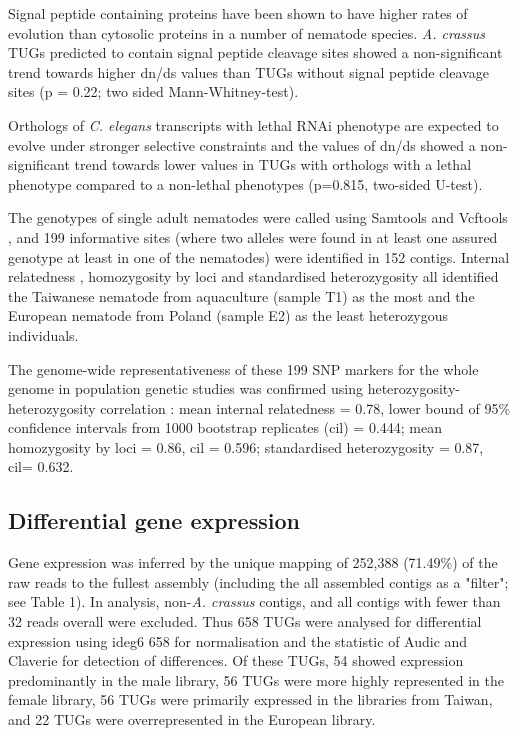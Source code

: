 \documentclass[10pt]{bmc_article}
\newenvironment{bmcformat}{\begin{raggedright}\baselineskip20pt\sloppy\setboolean{publ}{false}}{\end{raggedright}\baselineskip20pt\sloppy}
\begin{document}
\begin{bmcformat}
Signal peptide containing proteins have been shown to have higher
rates of evolution than cytosolic proteins in a number of nematode
species. \textit{A. crassus} TUGs predicted to contain signal peptide
cleavage sites showed a non-significant trend towards higher dn/ds
values than TUGs without signal peptide cleavage sites (p =
0.22; two sided Mann-Whitney-test).

Orthologs of \textit{C. elegans} transcripts with lethal RNAi
phenotype are expected to evolve under stronger selective constraints
and the values of dn/ds showed a non-significant trend towards lower
values in TUGs with orthologs with a lethal phenotype compared to a
non-lethal phenotypes (p=0.815, two-sided
U-test).

The genotypes of single adult nematodes were called using Samtools
\cite{journals/bioinformatics/LiHWFRHMAD09} and Vcftools
\cite{pmid21653522}, and 199 informative sites (where
two alleles were found in at least one assured genotype at least in
one of the nematodes) were identified in 152
contigs. Internal relatedness \cite{pmid11571049}, homozygosity by
loci \cite{pmid17107491} and standardised heterozygosity
\cite{coltman81j} all identified the Taiwanese nematode from
aquaculture (sample T1) as the most and the European nematode from
Poland (sample E2) as the least heterozygous individuals.

The genome-wide representativeness of these 199 SNP
markers for the whole genome in population genetic studies was
confirmed using heterozygosity-heterozygosity correlation
\cite{pmid21565077}: mean internal relatedness = 0.78, lower bound of
95\% confidence intervals from 1000 bootstrap replicates (cil) =
0.444; mean homozygosity by loci = 0.86, cil = 0.596; standardised
heterozygosity = 0.87, cil= 0.632.

 \subsection*{Differential gene expression}
                





Gene expression was inferred by the unique mapping of 252,388
(71.49\%) of the raw reads to the fullest assembly (including the all
assembled contigs as a "filter"; see Table 1). In analysis,
non-\textit{A. crassus} contigs, and all contigs with fewer than 32
reads overall were excluded. Thus 658 TUGs were analysed for
differential expression using ideg6 658 for
normalisation and the statistic of Audic and Claverie
\cite{pmid9331369} for detection of differences. Of these TUGs, 54
showed expression predominantly in the male library, 56 TUGs were more
highly represented in the female library, 56 TUGs were primarily
expressed in the libraries from Taiwan, and 22 TUGs were
overrepresented in the European library.


\end{bmcformat}
\end{document}
